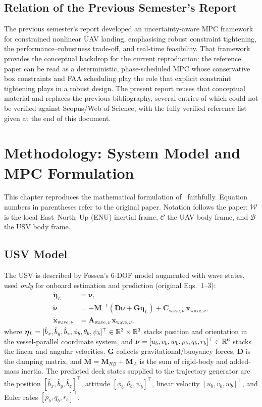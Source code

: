 \documentclass[12pt,a4paper]{report}
\begin{document}
\section{Relation of the Previous Semester's Report}
The previous semester's report developed an uncertainty-aware MPC framework for constrained nonlinear UAV landing, emphasising robust constraint tightening, the performance--robustness trade-off, and real-time feasibility. That framework provides the conceptual backdrop for the current reproduction: the reference paper can be read as a deterministic, phase-scheduled MPC whose conservative box constraints and FAA scheduling play the role that explicit constraint tightening plays in a robust design. The present report reuses that conceptual material and replaces the previous bibliography, several entries of which could not be verified against Scopus/Web of Science, with the fully verified reference list given at the end of this document.

\chapter{Methodology: System Model and MPC Formulation}\label{ch:method}
This chapter reproduces the mathematical formulation of~\cite{prochazka2024} faithfully. Equation numbers in parentheses refer to the original paper. Notation follows the paper: $\mathcal{W}$ is the local East--North--Up (ENU) inertial frame, $\mathcal{C}$ the UAV body frame, and $\mathcal{B}$ the USV body frame.

\section{USV Model}
The USV is described by Fossen's 6-DOF model augmented with wave states, used \emph{only} for onboard estimation and prediction (original Eqs.~1--3):
\begin{align}
\dot{\bm{\eta}}_L &= \bm{\nu}, \label{eq:usv1}\\
\dot{\bm{\nu}} &= -\bm{M}^{-1}\!\left(\bm{D}\bm{\nu} + \bm{G}\bm{\eta}_L\right) + \bm{C}_{\mathrm{wave},\nu}\,\bm{x}_{\mathrm{wave},\nu}, \label{eq:usv2}\\
\dot{\bm{x}}_{\mathrm{wave},\nu} &= \bm{A}_{\mathrm{wave},\nu}\,\bm{x}_{\mathrm{wave},\nu}, \label{eq:usv3}
\end{align}
where $\bm{\eta}_L = [\hat{b}_x,\hat{b}_y,\hat{b}_z,\phi_b,\theta_b,\psi_b]^\top \in \mathbb{R}^{3}\times\mathbb{R}^{3}$ stacks position and orientation in the vessel-parallel coordinate system, and $\bm{\nu} = [u_b,v_b,w_b,p_b,q_b,r_b]^\top \in \mathbb{R}^{6}$ stacks the linear and angular velocities. $\bm{G}$ collects gravitational/buoyancy forces, $\bm{D}$ is the damping matrix, and $\bm{M}=\bm{M}_{RB}+\bm{M}_A$ is the sum of rigid-body and added-mass inertia. The predicted deck states supplied to the trajectory generator are the position $[\hat{b}_x,\hat{b}_y,\hat{b}_z]^\top$, attitude $[\phi_b,\theta_b,\psi_b]^\top$, linear velocity $[u_b,v_b,w_b]^\top$, and Euler rates $[p_b,q_b,r_b]^\top$.
\end{document}
